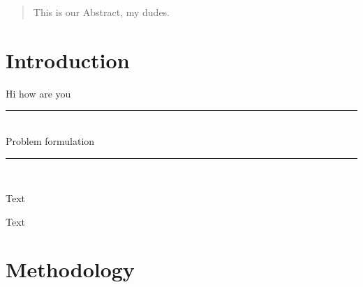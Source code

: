 \documentclass[12p]{article}
\newcommand{\SlimHRule}{\rule{\linewidth}{0.25mm}} %
\begin{document}

\begin{abstract}
\thispagestyle{plain} %
    This is our Abstract, my dudes.

\end{abstract}

\newpage


\tableofcontents %
\thispagestyle{plain} %

\newpage %


\section{Introduction}

Hi how are you

\begin{center}
    \vspace{1em}
    \SlimHRule\\[0.1cm]
    \Large{Problem formulation}
    \SlimHRule\\[0.1cm]
    \vspace{1em}
\end{center}

Text \medskip

Text


\newpage
\section{Methodology} \label{Methodology}
\end{document}

